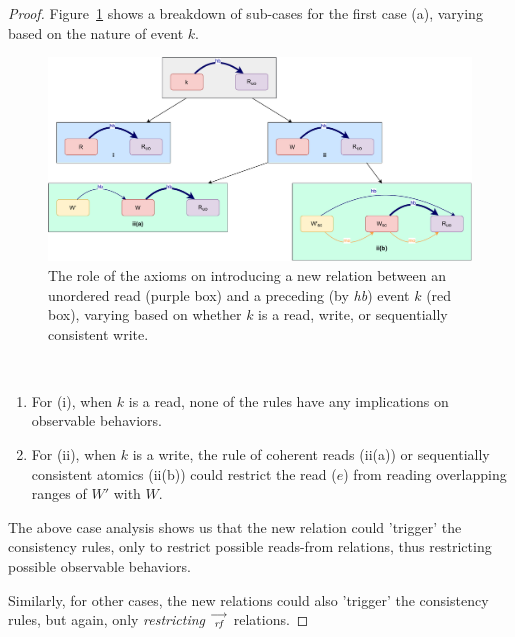 \begin{proof}
        Figure~\ref{fig:subcases} shows a breakdown of sub-cases for the first case (a), varying based
        on the nature of event $k$.
        \begin{figure}
            \centering
            \includegraphics[width=\textwidth]{Q3_(b)Case1.pdf}
            \caption{The role of the axioms on introducing a new relation between an unordered read (purple box) and a preceding (by \textit{hb}) event $k$ (red box), varying based on whether $k$ is a read, write, or sequentially consistent write.}
            \label{fig:subcases}
        \end{figure}
        \
        \begin{enumerate}
            \item For (i), when $k$ is a read, none of the rules have any implications on observable behaviors.
            \item For (ii), when $k$ is a write, the rule of coherent reads (ii(a)) or sequentially consistent atomics (ii(b)) could restrict the read ($e$) from reading overlapping ranges of $W'$ with $W$.
        \end{enumerate}
        
        The above case analysis shows us that the new relation could 'trigger' the consistency rules, only to restrict possible reads-from relations, thus restricting possible observable behaviors. 
       
        Similarly, for other cases, the new relations could also 'trigger' the consistency rules, but again, only  \emph{restricting} $\stackrel{\longrightarrow}{_\textit{rf}}$ relations. 


\end{proof}
